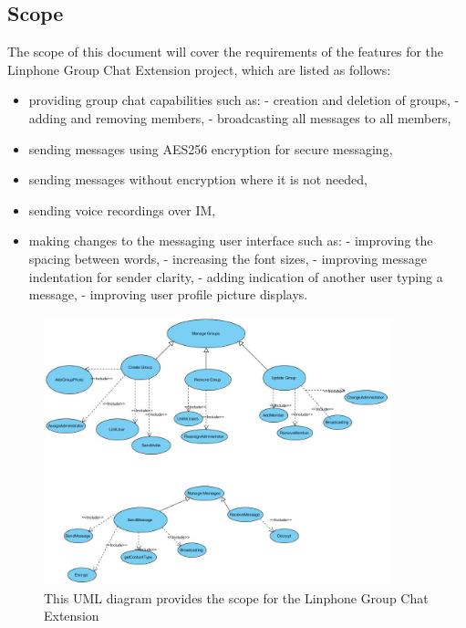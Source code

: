 \documentclass[11pt]{article}
\begin{document}
\subsection{Scope}
The scope of this document will cover the requirements of the features for the Linphone Group Chat Extension project, which are listed as follows:
\begin{itemize}
\item providing group chat capabilities such as:
\subitem  - creation and deletion of groups,
\subitem  - adding and removing members,
\subitem  - broadcasting all messages to all members,
\item sending messages using AES256 encryption for secure messaging,
\item sending messages without encryption where it is not needed,
\item sending voice recordings over IM,
\item making changes to the messaging user interface such as:
\subitem  - improving the spacing between words,
\subitem  - increasing the font sizes,
\subitem  - improving message indentation for sender clarity,
\subitem  - adding indication of another user typing a message,
\subitem  - improving user profile picture displays.
\end{itemize}
\begin{figure}[H]
\centering
\includegraphics[width=380px]{./images/scope.jpg}
\caption[Project Scope]{This UML diagram provides the scope for the Linphone Group Chat Extension}
\label{figure-scope-master}
\end{figure}
\end{document}
